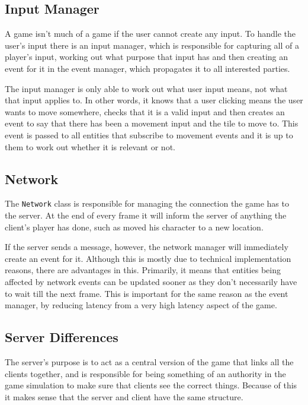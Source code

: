 \subsection{Input Manager}
A game isn't much of a game if the user cannot create any input. To handle the user's input there is an input manager, which is responsible for capturing all of a player's input, working out what purpose that input has and then creating an event for it in the event manager, which propagates it to all interested parties.

The input manager is only able to work out what user input means, not what that input applies to. In other words, it knows that a user clicking means the user wants to move somewhere, checks that it is a valid input and then creates an event to say that there has been a movement input and the tile to move to. This event is passed to all entities that subscribe to movement events and it is up to them to work out whether it is relevant or not.

\subsection{Network}
The \texttt{Network} class is responsible for managing the connection the game has to the server. At the end of every frame it will inform the server of anything the client's player has done, such as moved his character to a new location.

If the server sends a message, however, the network manager will immediately create an event for it. Although this is mostly due to technical implementation reasons, there are advantages in this. Primarily, it means that entities being affected by network events can be updated sooner as they don't necessarily have to wait till the next frame. This is important for the same reason as the event manager, by reducing latency from a very high latency aspect of the game.

\subsection{Server Differences}

The server's purpose is to act as a central version of the game that links all the clients together, and is responsible for being something of an authority in the game simulation to make sure that clients see the correct things. Because of this it makes sense that the server and client have the same structure.

